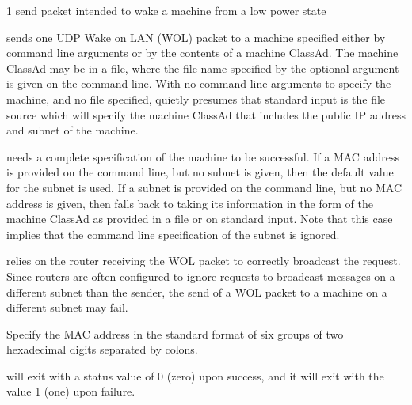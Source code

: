 \begin{ManPage}{\label{man-condor-power}}{1}
{send packet intended to wake a machine from a low power state}

\Synopsis 
{}



\Description

 sends one UDP Wake on LAN (WOL) packet to a machine
specified either by command line arguments or by the contents
of a machine ClassAd.
The machine ClassAd may be in a file, where the 
file name specified by the optional argument  
is given on the command line.
With no command line arguments to specify the machine,
and no file specified,  quietly presumes that standard input
is the file source which will
specify the machine ClassAd that includes the public IP address
and subnet of the machine.

 needs a complete specification of the machine to
be successful.
If a MAC address is provided on the command line, but no subnet is given,
then the default value for the subnet is used.
If a subnet is provided on the command line, but no MAC address is given,
then  falls back to taking its information in the form
of the machine ClassAd as provided in a file or on standard input.
Note that this case implies that the command line specification of the 
subnet is ignored.

 relies on the router receiving the WOL packet to correctly
broadcast the request. 
Since routers are often configured to ignore
requests to broadcast messages on a different subnet than the sender,
the send of a WOL packet to a machine on a different subnet may fail.

\begin{Options}
   {Specify the MAC address in the standard
    format of six groups of two hexadecimal digits separated by colons. }

\end{Options}

\ExitStatus

 will exit with a status value of 0 (zero) upon success,
and it will exit with the value 1 (one) upon failure.

\end{ManPage}
